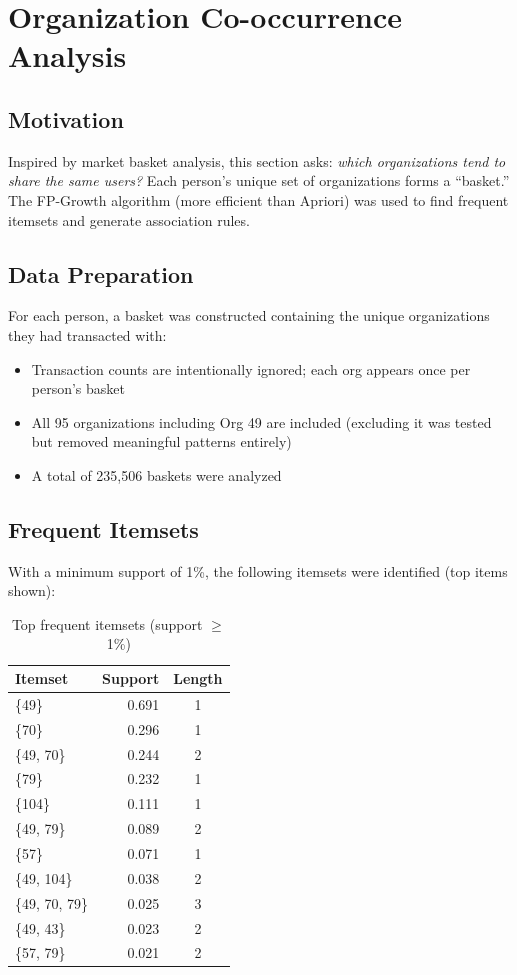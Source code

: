 \documentclass[11pt,a4paper]{article}
\begin{document}
\section{Organization Co-occurrence Analysis}

\subsection{Motivation}

Inspired by market basket analysis, this section asks: \textit{which organizations tend to share the same users?} Each person's unique set of organizations forms a ``basket.'' The FP-Growth algorithm (more efficient than Apriori) was used to find frequent itemsets and generate association rules.

\subsection{Data Preparation}

For each person, a basket was constructed containing the unique organizations they had transacted with:
\begin{itemize}
    \item Transaction counts are intentionally ignored; each org appears once per person's basket
    \item All 95 organizations including Org 49 are included (excluding it was tested but removed meaningful patterns entirely)
    \item A total of 235{,}506 baskets were analyzed
\end{itemize}

\subsection{Frequent Itemsets}

With a minimum support of 1\%, the following itemsets were identified (top items shown):

\begin{table}[H]
\centering
\begin{tabular}{lrc}
\toprule
\textbf{Itemset} & \textbf{Support} & \textbf{Length} \\
\midrule
\{49\} & 0.691 & 1 \\
\{70\} & 0.296 & 1 \\
\{49, 70\} & 0.244 & 2 \\
\{79\} & 0.232 & 1 \\
\{104\} & 0.111 & 1 \\
\{49, 79\} & 0.089 & 2 \\
\{57\} & 0.071 & 1 \\
\{49, 104\} & 0.038 & 2 \\
\{49, 70, 79\} & 0.025 & 3 \\
\{49, 43\} & 0.023 & 2 \\
\{57, 79\} & 0.021 & 2 \\
\bottomrule
\end{tabular}
\caption{Top frequent itemsets (support $\geq$ 1\%)}
\end{table}
\end{document}
